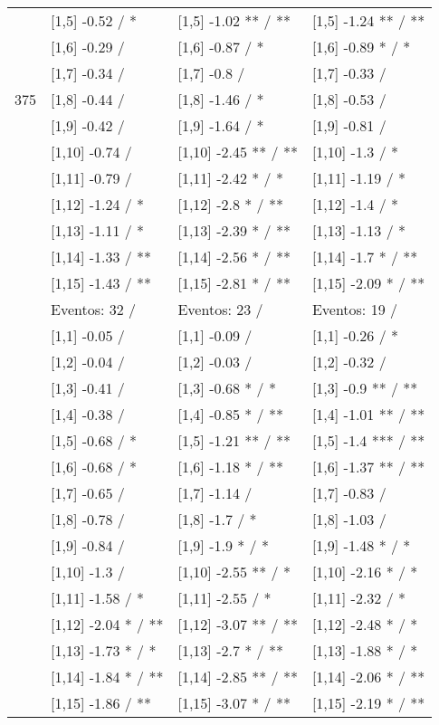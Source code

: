 \begin{table}
\begin{tabular}[t]{llll}
 & {}[1,5] -0.52  / * & {}[1,5] -1.02 ** / ** & {}[1,5] -1.24 ** / **\\
 & {}[1,6] -0.29  / & {}[1,6] -0.87  / * & {}[1,6] -0.89 * / *\\
 & {}[1,7] -0.34  / & {}[1,7] -0.8  / & {}[1,7] -0.33  /\\
375 & {}[1,8] -0.44  / & {}[1,8] -1.46  / * & {}[1,8] -0.53  /\\
\addlinespace
 & {}[1,9] -0.42  / & {}[1,9] -1.64  / * & {}[1,9] -0.81  /\\
 & {}[1,10] -0.74  / & {}[1,10] -2.45 ** / ** & {}[1,10] -1.3  / *\\
 & {}[1,11] -0.79  / & {}[1,11] -2.42 * / * & {}[1,11] -1.19  / *\\
 & {}[1,12] -1.24  / * & {}[1,12] -2.8 * / ** & {}[1,12] -1.4  / *\\
 & {}[1,13] -1.11  / * & {}[1,13] -2.39 * / ** & {}[1,13] -1.13  / *\\
\addlinespace
 & {}[1,14] -1.33  / ** & {}[1,14] -2.56 * / ** & {}[1,14] -1.7 * / **\\
 & {}[1,15] -1.43  / ** & {}[1,15] -2.81 * / ** & {}[1,15] -2.09 * / **\\
 & Eventos:  32 / & Eventos:  23 / & Eventos:  19 /\\
 & {}[1,1] -0.05  / & {}[1,1] -0.09  / & {}[1,1] -0.26  / *\\
 & {}[1,2] -0.04  / & {}[1,2] -0.03  / & {}[1,2] -0.32  /\\
\addlinespace
 & {}[1,3] -0.41  / & {}[1,3] -0.68 * / * & {}[1,3] -0.9 ** / **\\
 & {}[1,4] -0.38  / & {}[1,4] -0.85 * / ** & {}[1,4] -1.01 ** / **\\
 & {}[1,5] -0.68  / * & {}[1,5] -1.21 ** / ** & {}[1,5] -1.4 *** / **\\
 & {}[1,6] -0.68  / * & {}[1,6] -1.18 * / ** & {}[1,6] -1.37 ** / **\\
 & {}[1,7] -0.65  / & {}[1,7] -1.14  / & {}[1,7] -0.83  /\\
\addlinespace
500 & {}[1,8] -0.78  / & {}[1,8] -1.7  / * & {}[1,8] -1.03  /\\
 & {}[1,9] -0.84  / & {}[1,9] -1.9 * / * & {}[1,9] -1.48 * / *\\
 & {}[1,10] -1.3  / & {}[1,10] -2.55 ** / * & {}[1,10] -2.16 * / *\\
 & {}[1,11] -1.58  / * & {}[1,11] -2.55  / * & {}[1,11] -2.32  / *\\
 & {}[1,12] -2.04 * / ** & {}[1,12] -3.07 ** / ** & {}[1,12] -2.48 * / *\\
\addlinespace
 & {}[1,13] -1.73 * / * & {}[1,13] -2.7 * / ** & {}[1,13] -1.88 * / *\\
 & {}[1,14] -1.84 * / ** & {}[1,14] -2.85 ** / ** & {}[1,14] -2.06 * / **\\
 & {}[1,15] -1.86  / ** & {}[1,15] -3.07 * / ** & {}[1,15] -2.19 * / **\\
\bottomrule
\end{tabular}
\end{table}

